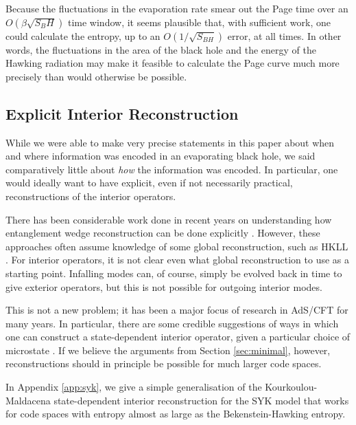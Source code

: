 \documentclass[11pt,a4paper]{article}
\begin{document}
Because the fluctuations in the evaporation rate smear out the Page time over an $O(\beta \sqrt{S_BH})$ time window, it seems plausible that, with sufficient work, one could calculate the entropy, up to an $O(1/\sqrt{S_{BH}})$ error, at all times. In other words, the fluctuations in the area of the black hole and the energy of the Hawking radiation may make it feasible to calculate the Page curve much more precisely than would otherwise be possible.

\subsection{Explicit Interior Reconstruction} \label{sec:explicit}
While we were able to make very precise statements in this paper about when and where information was encoded in an evaporating black hole, we said comparatively little about \emph{how} the information was encoded. In particular, one would ideally want to have explicit, even if not necessarily practical, reconstructions of the interior operators. 

There has been considerable work done in recent years on understanding how entanglement wedge reconstruction can be done explicitly \cite{cotler2017entanglement, faulkner2017bulk, chen2019entanglement}. However, these approaches often assume knowledge of some global reconstruction, such as HKLL \cite{hamilton2006local}. For interior operators, it is not clear even what global reconstruction to use as a starting point. Infalling modes can, of course, simply be evolved back in time to give exterior operators, but this is not possible for outgoing interior modes. 

This is not a new problem; it has been a major focus of research in AdS/CFT for many years. In particular, there are some credible suggestions of ways in which one can construct a state-dependent interior operator, given a particular choice of microstate \cite{papadodimas2013infalling, papadodimas2014state, kourkoulou2017pure}. If we believe the arguments from Section \ref{sec:minimal}, however, reconstructions should in principle be possible for much larger code spaces.

In Appendix \ref{app:syk}, we give a simple generalisation of the Kourkoulou-Maldacena state-dependent interior reconstruction for the SYK model that works for code spaces with entropy almost as large as the Bekenstein-Hawking entropy.
\end{document}
